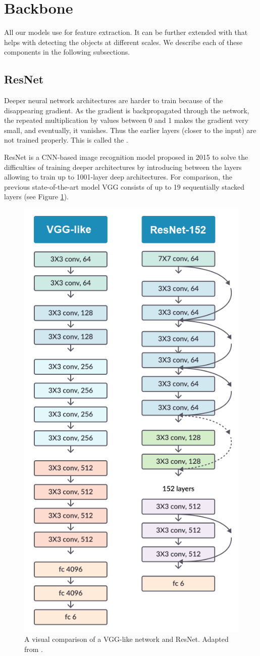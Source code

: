 \section{Backbone}
All our models use  \cite{resnet} for feature extraction. It can be further extended with  \cite{fpn} that helps with detecting the objects at different scales. We describe each of these components in the following subsections.

\subsection{ResNet}
Deeper neural network architectures are harder to train because of the disappearing gradient. As the gradient is backpropagated through the network, the repeated multiplication by values between 0 and 1 makes the gradient very small, and eventually, it vanishes. Thus the earlier layers (closer to the input) are not trained properly. This is called the . 

ResNet is a CNN-based image recognition model proposed in 2015 \cite{resnet} to solve the difficulties of training deeper architectures by introducing  between the layers allowing to train up to 1001-layer deep architectures. For comparison, the previous state-of-the-art model VGG \cite{vgg} consists of up to 19 sequentially stacked layers (see Figure \ref{fig:vgg_resnet}).

\begin{figure}[h]
    \centering
    \includegraphics[width=0.4\linewidth]{Sources/Figures/vgg_resnet.png}
    \caption{A visual comparison of a VGG-like network and ResNet. Adapted from \cite{resnet}.}
    \label{fig:vgg_resnet}
\end{figure}

